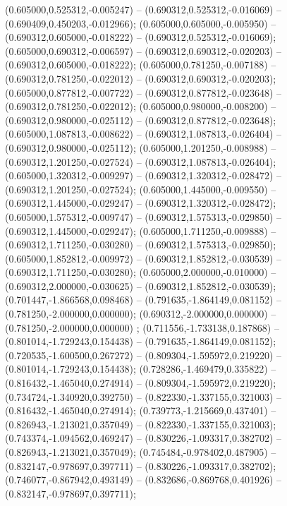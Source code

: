  (0.605000,0.525312,-0.005247) -- (0.690312,0.525312,-0.016069) -- (0.690409,0.450203,-0.012966);
 (0.605000,0.605000,-0.005950) -- (0.690312,0.605000,-0.018222) -- (0.690312,0.525312,-0.016069);
 (0.605000,0.690312,-0.006597) -- (0.690312,0.690312,-0.020203) -- (0.690312,0.605000,-0.018222);
 (0.605000,0.781250,-0.007188) -- (0.690312,0.781250,-0.022012) -- (0.690312,0.690312,-0.020203);
 (0.605000,0.877812,-0.007722) -- (0.690312,0.877812,-0.023648) -- (0.690312,0.781250,-0.022012);
 (0.605000,0.980000,-0.008200) -- (0.690312,0.980000,-0.025112) -- (0.690312,0.877812,-0.023648);
 (0.605000,1.087813,-0.008622) -- (0.690312,1.087813,-0.026404) -- (0.690312,0.980000,-0.025112);
 (0.605000,1.201250,-0.008988) -- (0.690312,1.201250,-0.027524) -- (0.690312,1.087813,-0.026404);
 (0.605000,1.320312,-0.009297) -- (0.690312,1.320312,-0.028472) -- (0.690312,1.201250,-0.027524);
 (0.605000,1.445000,-0.009550) -- (0.690312,1.445000,-0.029247) -- (0.690312,1.320312,-0.028472);
 (0.605000,1.575312,-0.009747) -- (0.690312,1.575313,-0.029850) -- (0.690312,1.445000,-0.029247);
 (0.605000,1.711250,-0.009888) -- (0.690312,1.711250,-0.030280) -- (0.690312,1.575313,-0.029850);
 (0.605000,1.852812,-0.009972) -- (0.690312,1.852812,-0.030539) -- (0.690312,1.711250,-0.030280);
 (0.605000,2.000000,-0.010000) -- (0.690312,2.000000,-0.030625) -- (0.690312,1.852812,-0.030539);
 (0.701447,-1.866568,0.098468) -- (0.791635,-1.864149,0.081152) -- (0.781250,-2.000000,0.000000);
 (0.690312,-2.000000,0.000000) -- (0.781250,-2.000000,0.000000) ;
 (0.711556,-1.733138,0.187868) -- (0.801014,-1.729243,0.154438) -- (0.791635,-1.864149,0.081152);
 (0.720535,-1.600500,0.267272) -- (0.809304,-1.595972,0.219220) -- (0.801014,-1.729243,0.154438);
 (0.728286,-1.469479,0.335822) -- (0.816432,-1.465040,0.274914) -- (0.809304,-1.595972,0.219220);
 (0.734724,-1.340920,0.392750) -- (0.822330,-1.337155,0.321003) -- (0.816432,-1.465040,0.274914);
 (0.739773,-1.215669,0.437401) -- (0.826943,-1.213021,0.357049) -- (0.822330,-1.337155,0.321003);
 (0.743374,-1.094562,0.469247) -- (0.830226,-1.093317,0.382702) -- (0.826943,-1.213021,0.357049);
 (0.745484,-0.978402,0.487905) -- (0.832147,-0.978697,0.397711) -- (0.830226,-1.093317,0.382702);
 (0.746077,-0.867942,0.493149) -- (0.832686,-0.869768,0.401926) -- (0.832147,-0.978697,0.397711);
